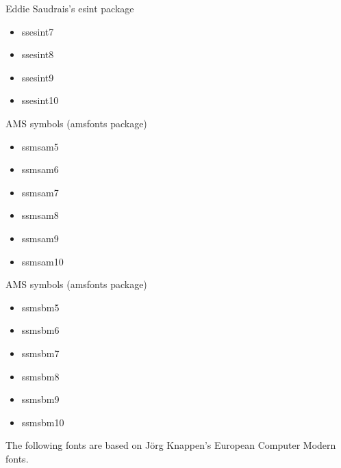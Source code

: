 \documentclass{amsart}
\begin{document}
\nobreak

\noindent\parbox[t]{0.33\textwidth}{
\raggedright
Eddie Saudrais's \textsf{esint} package
\begin{itemize}
\item \textsf{ssesint7}
\item \textsf{ssesint8}
\item \textsf{ssesint9}
\item \textsf{ssesint10}
\end{itemize}}\parbox[t]{0.33\textwidth}{
\raggedright
AMS symbols (\textsf{amsfonts} package)
\begin{itemize}
\item \textsf{ssmsam5}
\item \textsf{ssmsam6}
\item \textsf{ssmsam7}
\item \textsf{ssmsam8}
\item \textsf{ssmsam9}
\item \textsf{ssmsam10}
\end{itemize}}\parbox[t]{0.33\textwidth}{
\raggedright
AMS symbols (\textsf{amsfonts} package)
\begin{itemize}
\item \textsf{ssmsbm5}
\item \textsf{ssmsbm6}
\item \textsf{ssmsbm7}
\item \textsf{ssmsbm8}
\item \textsf{ssmsbm9}
\item \textsf{ssmsbm10}
\end{itemize}}

\bigskip

The following fonts are based on J\"org Knappen's European Computer Modern fonts.

\nobreak
\end{document}
